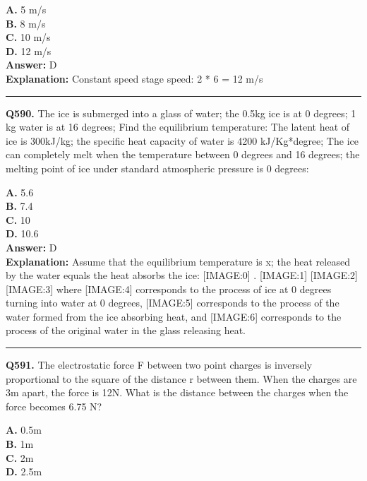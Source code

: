 \documentclass[12pt]{article}
\begin{document}
\textbf{A.} 5 m/s \\
\textbf{B.} 8 m/s \\
\textbf{C.} 10 m/s \\
\textbf{D.} 12 m/s \\

\textbf{Answer:} D \\
\textbf{Explanation:} Constant speed stage speed: 2
*
6 = 12 m/s

\hrule
\vspace{1em}


\noindent
\textbf{Q590.} The ice is submerged into a glass of water; the 0.5kg ice is at 0 degrees; 1 kg water is at 16 degrees; Find the equilibrium temperature: The latent heat of ice is 300kJ/kg; the specific heat capacity of water is 4200 kJ/Kg*degree; The ice can completely melt when the temperature between 0 degrees and 16 degrees; the melting point of ice under standard atmospheric pressure is 0 degrees:



\textbf{A.} 5.6 \\
\textbf{B.} 7.4 \\
\textbf{C.} 10 \\
\textbf{D.} 10.6 \\

\textbf{Answer:} D \\
\textbf{Explanation:} Assume that the equilibrium temperature is x; the heat released by the water equals the heat absorbs the ice:
[IMAGE:0]
.
[IMAGE:1]
[IMAGE:2]
[IMAGE:3]
where
[IMAGE:4]
corresponds to the process of ice at 0 degrees turning into water at 0 degrees,
[IMAGE:5]
corresponds to the process of the water formed from the ice absorbing heat, and
[IMAGE:6]
corresponds to the process of the original water in the glass releasing heat.

\hrule
\vspace{1em}


\noindent
\textbf{Q591.} The electrostatic force F between two point charges is inversely proportional to the square of the distance r between them. When the charges are 3m apart, the force is 12N. What is the distance between the charges when the force becomes
6.75
N?



\textbf{A.} 0.5m \\
\textbf{B.} 1m \\
\textbf{C.} 2m \\
\textbf{D.} 2.5m \\
\end{document}
